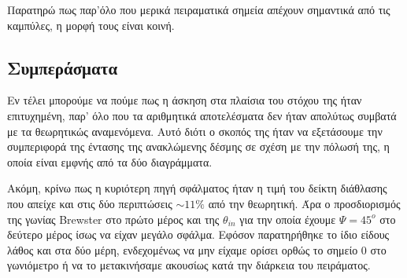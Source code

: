 \documentclass[a4paper]{article}
\begin{document}
Παρατηρώ πως παρ'όλο που μερικά πειραματικά σημεία απέχουν σημαντικά από τις καμπύλες, η μορφή τους είναι κοινή.

\subsection*{Συμπεράσματα}


Εν τέλει μπορούμε να πούμε πως η άσκηση στα πλαίσια του στόχου της ήταν επιτυχημένη, παρ' όλο που τα αριθμητικά αποτελέσματα δεν ήταν απολύτως συμβατά με τα θεωρητικώς αναμενόμενα. Αυτό διότι ο σκοπός της ήταν να εξετάσουμε την συμπεριφορά της έντασης της ανακλώμενης δέσμης σε σχέση με την πόλωσή της, η οποία είναι εμφνής από τα δύο διαγράμματα. 

Ακόμη, κρίνω πως η κυριότερη πηγή σφάλματος ήταν η τιμή του δείκτη διάθλασης που απείχε και στις δύο περιπτώσεις $\sim 11\%$ από την θεωρητική. Άρα ο προσδιορισμός της γωνίας Brewster στο πρώτο μέρος και της $\theta_{in}$ για την οποία έχουμε $\Psi=45^o$ στο δεύτερο μέρος ίσως να είχαν μεγάλο σφάλμα. Εφόσον παρατηρήθηκε το ίδιο είδους λάθος και στα δύο μέρη, ενδεχομένως να μην είχαμε ορίσει ορθώς το σημείο 0 στο γωνιόμετρο ή να το μετακινήσαμε ακουσίως κατά την διάρκεια του πειράματος.
\end{document}
